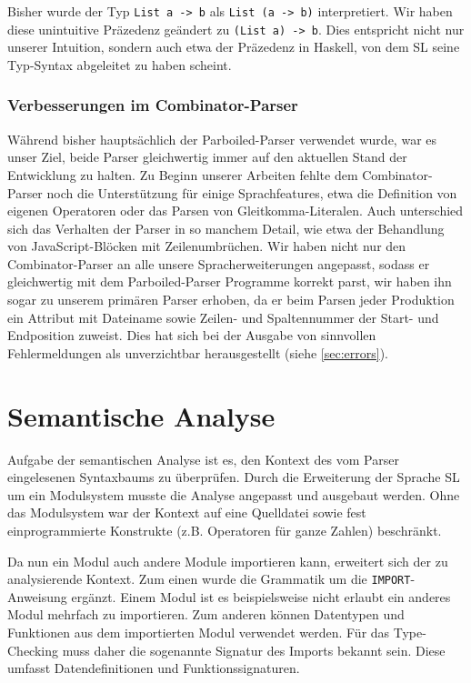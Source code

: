 \documentclass[runningheads]{llncs}
\begin{document}
Bisher wurde der Typ \verb|List a -> b| als \verb|List (a -> b)|
interpretiert.  Wir haben diese unintuitive Präzedenz geändert zu
\verb|(List a) -> b|.  Dies entspricht nicht nur unserer Intuition,
sondern auch etwa der Präzedenz in Haskell, von dem SL seine
Typ-Syntax abgeleitet zu haben scheint. 

\subsubsection{Verbesserungen im Combinator-Parser}

Während bisher hauptsächlich der Parboiled-Parser verwendet wurde, war
es unser Ziel, beide Parser gleichwertig immer auf den aktuellen Stand
der Entwicklung zu halten.  Zu Beginn unserer Arbeiten fehlte dem
Combinator-Parser noch die Unterstützung für einige Sprachfeatures,
etwa die Definition von eigenen Operatoren oder das Parsen von
Gleitkomma-Literalen.  Auch unterschied sich das Verhalten der Parser
in so manchem Detail, wie etwa der Behandlung von JavaScript-Blöcken
mit Zeilenumbrüchen.  Wir haben nicht nur den Combinator-Parser 
an alle unsere Spracherweiterungen angepasst, sodass er gleichwertig
mit dem Parboiled-Parser Programme korrekt parst, wir haben ihn sogar
zu unserem primären Parser erhoben, da er beim Parsen jeder Produktion
ein Attribut mit Dateiname sowie Zeilen- und Spaltennummer der Start-
und Endposition zuweist.  Dies hat sich bei der Ausgabe von sinnvollen
Fehlermeldungen als unverzichtbar herausgestellt (siehe
\ref{sec:errors}).

\section{Semantische Analyse}
\label{sec:semantics}

Aufgabe der semantischen Analyse ist es, den Kontext des vom Parser eingelesenen Syntaxbaums zu überprüfen. Durch die Erweiterung der Sprache SL um ein Modulsystem musste die Analyse angepasst und ausgebaut werden. Ohne das Modulsystem war der Kontext auf eine Quelldatei sowie fest einprogrammierte Konstrukte (z.B. Operatoren für ganze Zahlen) beschränkt.

Da nun ein Modul auch andere Module importieren kann, erweitert sich der zu analysierende Kontext. Zum einen wurde die Grammatik um die \verb|IMPORT|-Anweisung ergänzt. Einem Modul ist es beispielsweise nicht erlaubt ein anderes Modul mehrfach zu importieren. Zum anderen können Datentypen und Funktionen aus dem importierten Modul verwendet werden. Für das Type-Checking muss daher die sogenannte Signatur des Imports bekannt sein. Diese umfasst Datendefinitionen und Funktionssignaturen.
\end{document}
